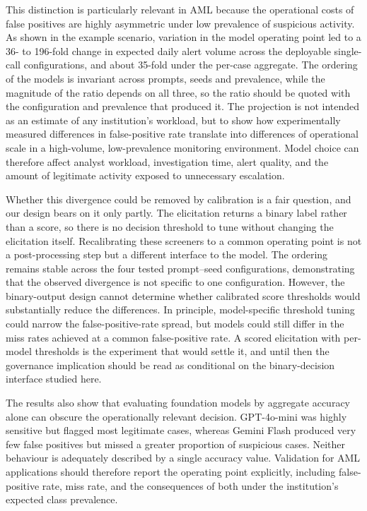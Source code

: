 \documentclass[pdflatex,sn-basic,Numbered]{sn-jnl}
\begin{document}
This distinction is particularly relevant in AML because the operational costs of false positives are highly asymmetric under low prevalence of suspicious activity. As shown in the example scenario, variation in the model operating point led to a 36- to 196-fold change in expected daily alert volume across the deployable single-call configurations, and about 35-fold under the per-case aggregate. The ordering of the models is invariant across prompts, seeds and prevalence, while the magnitude of the ratio depends on all three, so the ratio should be quoted with the configuration and prevalence that produced it. The projection is not intended as an estimate of any institution's workload, but to show how experimentally measured differences in false-positive rate translate into differences of operational scale in a high-volume, low-prevalence monitoring environment. Model choice can therefore affect analyst workload, investigation time, alert quality, and the amount of legitimate activity exposed to unnecessary escalation.

Whether this divergence could be removed by calibration is a fair question, and our design bears on it only partly. The elicitation returns a binary label rather than a score, so there is no decision threshold to tune without changing the elicitation itself. Recalibrating these screeners to a common operating point is not a post-processing step but a different interface to the model. The ordering remains stable across the four tested prompt--seed configurations, demonstrating that the observed divergence is not specific to one configuration. However, the binary-output design cannot determine whether calibrated score thresholds would substantially reduce the differences. In principle, model-specific threshold tuning could narrow the false-positive-rate spread, but models could still differ in the miss rates achieved at a common false-positive rate. A scored elicitation with per-model thresholds is the experiment that would settle it, and until then the governance implication should be read as conditional on the binary-decision interface studied here.

The results also show that evaluating foundation models by aggregate accuracy alone can obscure the operationally relevant decision. GPT-4o-mini was highly sensitive but flagged most legitimate cases, whereas Gemini Flash produced very few false positives but missed a greater proportion of suspicious cases. Neither behaviour is adequately described by a single accuracy value. Validation for AML applications should therefore report the operating point explicitly, including false-positive rate, miss rate, and the consequences of both under the institution's expected class prevalence.
\end{document}
